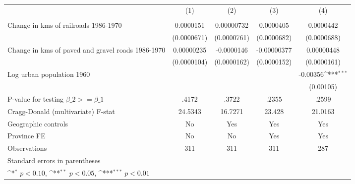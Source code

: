 {
\def\sym#1{\ifmmode^{#1}\else\(^{#1}\)\fi}
\begin{tabular}{l*{4}{c}}
\hline\hline
                &\multicolumn{1}{c}{(1)}&\multicolumn{1}{c}{(2)}&\multicolumn{1}{c}{(3)}&\multicolumn{1}{c}{(4)}\\
                &\multicolumn{1}{c}{}&\multicolumn{1}{c}{}&\multicolumn{1}{c}{}&\multicolumn{1}{c}{}\\
\hline
Change in kms of railroads 1986-1970&0.0000151         &0.00000732         &0.0000405         &0.0000442         \\
                &(0.0000671)         &(0.0000761)         &(0.0000682)         &(0.0000688)         \\
[1em]
Change in kms of paved and gravel roads 1986-1970&0.00000235         &-0.0000146         &-0.00000377         &0.00000448         \\
                &(0.0000104)         &(0.0000162)         &(0.0000152)         &(0.0000161)         \\
[1em]
Log urban population 1960&                  &                  &                  & -0.00356\sym{***}\\
                &                  &                  &                  &(0.00105)         \\
\hline
P-value for testing $\beta\_{2} >= \beta\_{1}$&    .4172         &    .3722         &    .2355         &    .2599         \\
Cragg-Donald (multivariate) F-stat&  24.5343         &  16.7271         &   23.428         &  21.0163         \\
Geographic controls&       No         &      Yes         &      Yes         &      Yes         \\
Province FE     &       No         &       No         &      Yes         &      Yes         \\
Observations    &      311         &      311         &      311         &      287         \\
\hline\hline
\multicolumn{5}{l}{\footnotesize Standard errors in parentheses}\\
\multicolumn{5}{l}{\footnotesize \sym{*} \(p<0.10\), \sym{**} \(p<0.05\), \sym{***} \(p<0.01\)}\\
\end{tabular}
}
